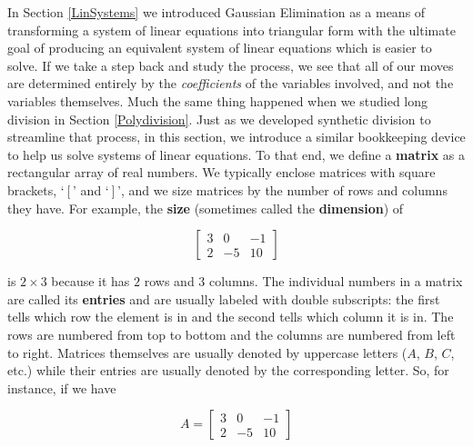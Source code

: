 

\setcounter{footnote}{0}

\label{AugMatrices}

\setlength{\extrarowheight}{0pt}

In Section \ref{LinSystems} we introduced Gaussian Elimination as a means of transforming a system of linear equations into triangular form with the ultimate goal of producing an equivalent system of linear equations which is easier to solve.  If we take a step back and study the process, we see that all of our moves are determined entirely by the \textit{coefficients} of the variables involved, and not the variables themselves.  Much the same thing happened when we studied long division in Section \ref{Polydivision}. Just as we developed synthetic division to streamline that process, in this section, we introduce a similar bookkeeping device to help us solve systems of linear equations.  To that end, we define a  \textbf{matrix} as a rectangular array of real numbers.  We typically enclose matrices with square brackets, `$\left[ \right.$' and `$\left. \right]$', and we size matrices by the number of rows and columns they have.  For example, the  \textbf{size} (sometimes called the   \textbf{dimension}) of 

\[ \left[ \begin{array}{rrr} 3 & 0 & -1 \\ 
2 & -5 & 10 \end{array} \right]\] 

is  $2 \times 3$  because it has $2$ rows and $3$ columns.  The individual numbers in a matrix are called its   \textbf{entries} and are usually labeled with double subscripts: the first tells which row the element is in and the second tells which column it is in.  The rows are numbered from top to bottom and the columns are numbered from left to right.  Matrices themselves are usually denoted by uppercase letters ($A$, $B$, $C$, etc.) while their entries are usually denoted by the corresponding letter.  So, for instance, if we have 

\[ A = \left[ \begin{array}{rrr} 3 & 0 & -1 \\ 
2 & -5 & 10 \end{array} \right]\] 

